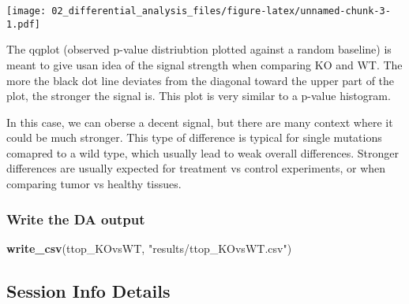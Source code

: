 \documentclass[]{article}
\newenvironment{Shaded}{\begin{snugshade}}{\end{snugshade}}
\newcommand{\KeywordTok}[1]{\textcolor[rgb]{0.13,0.29,0.53}{\textbf{#1}}}
\newcommand{\NormalTok}[1]{#1}
\newcommand{\StringTok}[1]{\textcolor[rgb]{0.31,0.60,0.02}{#1}}
\begin{document}
\texttt{[image: 02\_differential\_analysis\_files/figure-latex/unnamed-chunk-3-1.pdf]}

The qqplot (observed p-value distriubtion plotted against a random
baseline) is meant to give usan idea of the signal strength when
comparing KO and WT. The more the black dot line deviates from the
diagonal toward the upper part of the plot, the stronger the signal is.
This plot is very similar to a p-value histogram.

In this case, we can oberse a decent signal, but there are many context
where it could be much stronger. This type of difference is typical for
single mutations comapred to a wild type, which usually lead to weak
overall differences. Stronger differences are usually expected for
treatment vs control experiments, or when comparing tumor vs healthy
tissues.

\hypertarget{write-the-da-output}{%
\subsubsection{Write the DA output}\label{write-the-da-output}}

\begin{Shaded}
\begin{Highlighting}[]
\KeywordTok{write_csv}\NormalTok{(ttop_KOvsWT, }\StringTok{"results/ttop_KOvsWT.csv"}\NormalTok{)}
\end{Highlighting}
\end{Shaded}

\hypertarget{session-info-details}{%
\subsection{Session Info Details}\label{session-info-details}}
\end{document}
